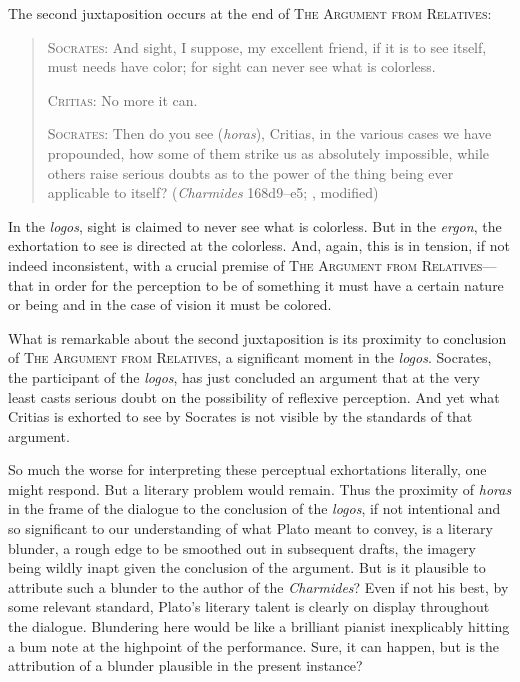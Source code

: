 The second juxtaposition occurs at the end of \textsc{The Argument from Relatives}:
\begin{quotation}
	\textsc{Socrates}: And sight, I suppose, my excellent friend, if it is to see itself, must needs have color; for sight can never see what is colorless.
	
	\textsc{Critias}: No more it can.
	
	\textsc{Socrates}: Then do you see (\emph{horas}), Critias, in the various cases we have propounded, how some of them strike us as absolutely impossible, while others raise serious doubts as to the power of the thing being ever applicable to itself? (\emph{Charmides} 168d9–e5; \citealt[63]{Lamb:1927qw}, modified)
\end{quotation}
In the \emph{logos}, sight is claimed to never see what is colorless. But in the \emph{ergon}, the exhortation to see is directed at the colorless. And, again, this is in tension, if not indeed inconsistent, with a crucial premise of \textsc{The Argument from Relatives}—that in order for the perception to be of something it must have a certain nature or being and in the case of vision it must be colored.

What is remarkable about the second juxtaposition is its proximity to conclusion of \textsc{The Argument from Relatives}, a significant moment in the \emph{logos}. Socrates, the participant of the \emph{logos}, has just concluded an argument that at the very least casts serious doubt on the possibility of reflexive perception. And yet what Critias is exhorted to see by Socrates is not visible by the standards of that argument. 

So much the worse for interpreting these perceptual exhortations literally, one might respond. But a literary problem would remain. Thus the proximity of \emph{horas} in the frame of the dialogue to the conclusion of the \emph{logos}, if not intentional and so significant to our understanding of what Plato meant to convey, is a literary blunder, a rough edge to be smoothed out in subsequent drafts, the imagery being wildly inapt given the conclusion of the argument. But is it plausible to attribute such a blunder to the author of the \emph{Charmides}? Even if not his best, by some relevant standard, Plato's literary talent is clearly on display throughout the dialogue. Blundering here would be like a brilliant pianist inexplicably hitting a bum note at the highpoint of the performance. Sure, it can happen, but is the attribution of a blunder plausible in the present instance?

